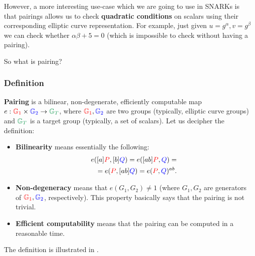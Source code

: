 \documentclass[../lecture-notes.tex]{subfiles}
\begin{document}
However, a more interesting use-case which we are going to use in SNARKs is that pairings allows us to check \textbf{quadratic conditions} on scalars using their corresponding elliptic curve representation. For example, just given $u=g^{\alpha},v=g^{\beta}$ we can check whether $\alpha\beta+5=0$ (which is impossible to check without having a pairing). 

So what is pairing?

\subsubsection{Definition}

\begin{definition}
    \textbf{Pairing} is a bilinear, non-degenerate, efficiently computable map $e: \textcolor{red}{\mathbb{G}_1} \times \textcolor{blue}{\mathbb{G}_2} \to \textcolor{ForestGreen}{\mathbb{G}_T}$, where $\textcolor{red}{\mathbb{G}_1},\textcolor{blue}{\mathbb{G}_2}$ are two groups (typically, elliptic curve groups) and $\textcolor{ForestGreen}{\mathbb{G}_T}$ is a target group (typically, a set of scalars). Let us decipher the definition:
    \begin{itemize}
        \item \textbf{Bilinearity} means essentially the following:
        \begin{equation*}
            \begin{aligned}
                e([a]\textcolor{red}{P},[b]\textcolor{blue}{Q}) = e([ab]\textcolor{red}{P},\textcolor{blue}{Q}) = \\
                = e(\textcolor{red}{P},[ab]\textcolor{blue}{Q}) = e(\textcolor{red}{P},\textcolor{blue}{Q})^{ab}.                        
            \end{aligned}
        \end{equation*}
        \item \textbf{Non-degeneracy} means that $e(G_1,G_2) \neq 1$ (where $G_1,G_2$ are generators of $\textcolor{red}{\mathbb{G}_1},\textcolor{blue}{\mathbb{G}_2}$, respectively). This property basically says that the pairing is not trivial.
        \item \textbf{Efficient computability} means that the pairing can be computed in a reasonable time.
    \end{itemize}

    The definition is illustrated in .
\end{definition}
\end{document}
